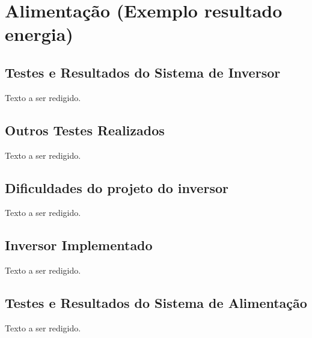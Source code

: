 \section{Alimentação (Exemplo resultado energia)}
	\subsection{Testes e Resultados do Sistema de Inversor}
	Texto a ser redigido.
\subsection{Outros Testes Realizados}
Texto a ser redigido.
\subsection{Dificuldades do projeto do inversor}
Texto a ser redigido.
\subsection{Inversor Implementado}
Texto a ser redigido.
\subsection{Testes e Resultados do Sistema de Alimentação}
Texto a ser redigido.